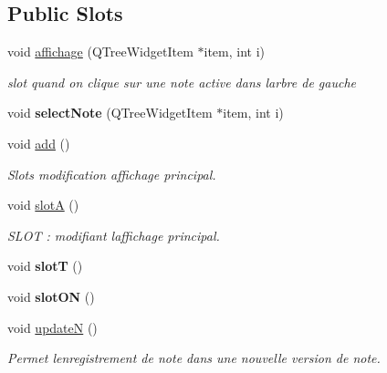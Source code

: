 \subsection*{Public Slots}
\begin{DoxyCompactItemize}
\item 
void \hyperlink{classMainWindow_a20e1b77fb7ab423eb41040fe84b3e723}{affichage} (Q\+Tree\+Widget\+Item $\ast$item, int i)
\begin{DoxyCompactList}\small\item\em slot quand on clique sur une note active dans l\textquotesingle{}arbre de gauche \end{DoxyCompactList}\item 
\mbox{\label{classMainWindow_a27d651d36d16ebcbd50b89e29a292387}} 
void {\bfseries select\+Note} (Q\+Tree\+Widget\+Item $\ast$item, int i)
\item 
void \hyperlink{classMainWindow_a25d69f74e563bb6df70d8b67cba8d794}{add} ()
\begin{DoxyCompactList}\small\item\em Slots modification affichage principal. \end{DoxyCompactList}\item 
\mbox{\label{classMainWindow_a814b24397c149491c2956b9a67eab44a}} 
void \hyperlink{classMainWindow_a814b24397c149491c2956b9a67eab44a}{slotA} ()
\begin{DoxyCompactList}\small\item\em S\+L\+OT \+: modifiant l\textquotesingle{}affichage principal. \end{DoxyCompactList}\item 
\mbox{\label{classMainWindow_a82494aeaf064533c8201d78bddcd12bc}} 
void {\bfseries slotT} ()
\item 
\mbox{\label{classMainWindow_a08e299f9068f7fb8415d88578f9388ea}} 
void {\bfseries slot\+ON} ()
\item 
\mbox{\label{classMainWindow_ac873f317956e3846fd64f3900e721add}} 
void \hyperlink{classMainWindow_ac873f317956e3846fd64f3900e721add}{updateN} ()
\begin{DoxyCompactList}\small\item\em Permet l\textquotesingle{}enregistrement de note dans une nouvelle version de note. \end{DoxyCompactList}\item 

\end{DoxyCompactItemize}
